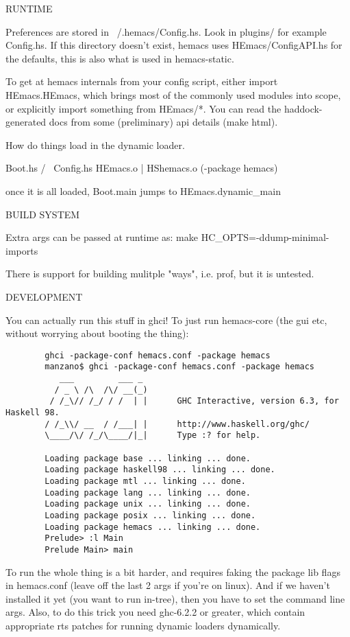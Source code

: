RUNTIME

Preferences are stored in ~/.hemacs/Config.hs. Look in plugins/ for
example Config.hs. If this directory doesn't exist, hemacs uses
HEmacs/ConfigAPI.hs for the defaults, this is also what is used in
hemacs-static.

To get at hemacs internals from your config script, either import
HEmacs.HEmacs, which brings most of the commonly used modules into
scope, or explicitly import something from HEmacs/*. You can read the
haddock-generated docs from some (preliminary) api details (make
html).

How do things load in the dynamic loader.
        
           Boot.hs
          /      \
      Config.hs HEmacs.o
                  |
                HShemacs.o (-package hemacs)

once it is all loaded, Boot.main jumps to HEmacs.dynamic\_main

BUILD SYSTEM

Extra args can be passed at runtime as: make HC\_OPTS=-ddump-minimal-imports

There is support for building mulitple "ways", i.e. prof, but it is
untested.

DEVELOPMENT

You can actually run this stuff in ghci! To just run hemacs-core (the gui etc,
without worrying about booting the thing):

\begin{verbatim}
        ghci -package-conf hemacs.conf -package hemacs
        manzano$ ghci -package-conf hemacs.conf -package hemacs
           ___         ___ _
          / _ \ /\  /\/ __(_)
         / /_\// /_/ / /  | |      GHC Interactive, version 6.3, for Haskell 98.
        / /_\\/ __  / /___| |      http://www.haskell.org/ghc/
        \____/\/ /_/\____/|_|      Type :? for help.

        Loading package base ... linking ... done.
        Loading package haskell98 ... linking ... done.
        Loading package mtl ... linking ... done.
        Loading package lang ... linking ... done.
        Loading package unix ... linking ... done.
        Loading package posix ... linking ... done.
        Loading package hemacs ... linking ... done.
        Prelude> :l Main
        Prelude Main> main
\end{verbatim}

To run the whole thing is a bit harder, and requires faking the
package lib flags in hemacs.conf (leave off the last 2 args if you're
on linux). And if we haven't installed it yet (you want to run
in-tree), then you have to set the command line args. Also, to do this
trick you need ghc-6.2.2 or greater, which contain appropriate rts
patches for running dynamic loaders dynamically.

